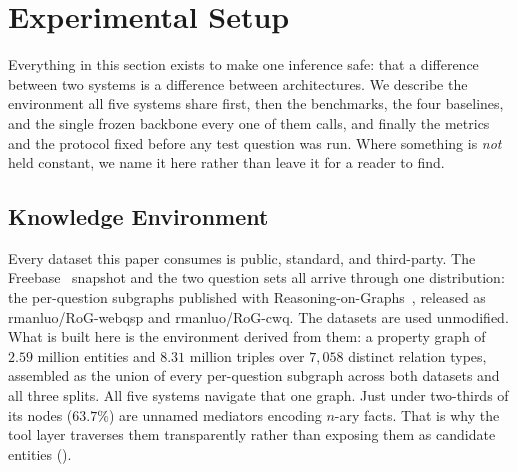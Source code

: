 %
%
%
%
%

\section{Experimental Setup}\label{sec:setup}

Everything in this section exists to make one inference safe: that a
difference between two systems is a difference between architectures. We
describe the environment all five systems share first, then the
benchmarks, the four baselines, and the single frozen backbone every one
of them calls, and finally the metrics and the protocol fixed before any
test question was run. Where something is \emph{not} held constant, we
name it here rather than leave it for a reader to find.

\subsection{Knowledge Environment}\label{sec:environment}

Every dataset this paper consumes is public, standard, and third-party.
The Freebase~\cite{bollacker2008freebase} snapshot and the two question
sets all arrive through one distribution: the per-question subgraphs
published with Reasoning-on-Graphs~\cite{luo2024reasoning}, released as
\textsf{rmanluo/RoG-webqsp} and \textsf{rmanluo/RoG-cwq}. The datasets
are used unmodified. What is built here is the environment derived from
them: a property graph of $2.59$ million entities and $8.31$ million
triples over $7{,}058$ distinct relation types, assembled as the union
of every per-question subgraph across both datasets and all three
splits. All five systems navigate that one graph. Just under two-thirds
of its nodes ($63.7\%$) are unnamed mediators encoding $n$-ary facts.
That is why the tool layer traverses them transparently rather than
exposing them as candidate entities ().


